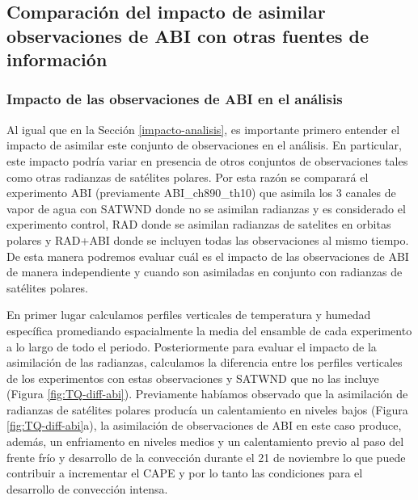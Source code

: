 \documentclass[12pt,oneside,a4paper]{reedthesis}
\begin{document}
\hypertarget{comparaciuxf3n-del-impacto-de-asimilar-observaciones-de-abi-con-otras-fuentes-de-informaciuxf3n}{%
\subsection{Comparación del impacto de asimilar observaciones de ABI con otras fuentes de información}\label{comparaciuxf3n-del-impacto-de-asimilar-observaciones-de-abi-con-otras-fuentes-de-informaciuxf3n}}

\hypertarget{impacto-de-las-observaciones-de-abi-en-el-anuxe1lisis}{%
\subsubsection{Impacto de las observaciones de ABI en el análisis}\label{impacto-de-las-observaciones-de-abi-en-el-anuxe1lisis}}

Al igual que en la Sección \ref{impacto-analisis}, es importante primero entender el impacto de asimilar este conjunto de observaciones en el análisis. En particular, este impacto podría variar en presencia de otros conjuntos de observaciones tales como otras radianzas de satélites polares. Por esta razón se comparará el experimento ABI (previamente ABI\_ch890\_th10) que asimila los 3 canales de vapor de agua con SATWND donde no se asimilan radianzas y es considerado el experimento control, RAD donde se asimilan radianzas de satelites en orbitas polares y RAD+ABI donde se incluyen todas las observaciones al mismo tiempo. De esta manera podremos evaluar cuál es el impacto de las observaciones de ABI de manera independiente y cuando son asimiladas en conjunto con radianzas de satélites polares.

En primer lugar calculamos perfiles verticales de temperatura y humedad específica promediando espacialmente la media del ensamble de cada experimento a lo largo de todo el periodo. Posteriormente para evaluar el impacto de la asimilación de las radianzas, calculamos la diferencia entre los perfiles verticales de los experimentos con estas observaciones y SATWND que no las incluye (Figura \ref{fig:TQ-diff-abi}). Previamente habíamos observado que la asimilación de radianzas de satélites polares producía un calentamiento en niveles bajos (Figura \ref{fig:TQ-diff-abi}a), la asimilación de observaciones de ABI en este caso produce, además, un enfriamento en niveles medios y un calentamiento previo al paso del frente frío y desarrollo de la convección durante el 21 de noviembre lo que puede contribuir a incrementar el CAPE y por lo tanto las condiciones para el desarrollo de convección intensa.
\end{document}
